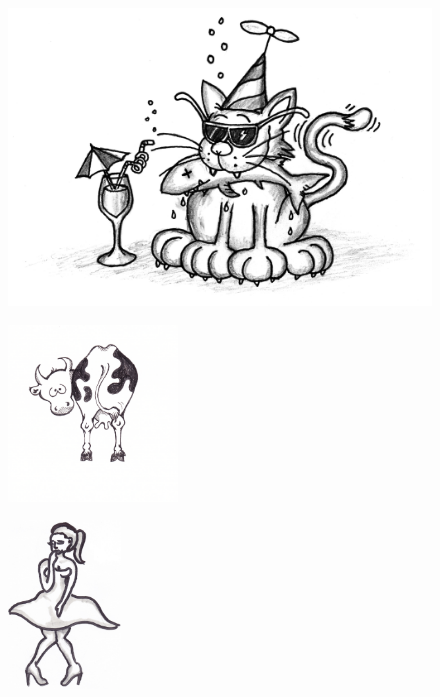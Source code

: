 
\begin{figure}[!b]
\begin{center}
\includegraphics[scale=.8]{../bilder/sillis.png} 
\end{center}
\end{figure}
\sclearpage

\begin{figure}[!b]
\begin{center}
\includegraphics[width=4.5cm]{../bilder/ko.jpg} 
\end{center}
\end{figure}
\sclearpage


\sclearpage

\sclearpage

\sclearpage

\begin{figure}[!b]
\begin{center}
\includegraphics[width=3cm]{../bilder/kissnodigflicka.jpg} 
\end{center}
\end{figure}
